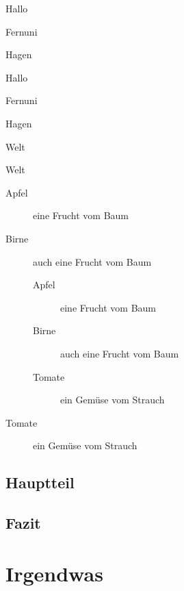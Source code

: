 \documentclass[12pt,ngerman,parskip=half]{scrreprt}
\begin{document}
\begin{compactenum}[I]
\item Hallo
\item Fernuni
\item Hagen
\begin{compactenum}[A.]
\item Hallo
\item Fernuni
\item Hagen
\item Welt
\end{compactenum}
\item Welt
\end{compactenum}


\begin{description}
\item[Apfel] eine Frucht vom Baum
\item[Birne] auch eine Frucht vom Baum

\begin{description}
\item[Apfel] eine Frucht vom Baum
\item[Birne] auch eine Frucht vom Baum
\item[Tomate] ein Gemüse vom Strauch
\end{description}

\item[Tomate] ein Gemüse vom Strauch
\end{description}


\section{Hauptteil}

\blindtext[1] 

\blindtext[1]

\section{Fazit}

\blindtext[1] 

\chapter{Irgendwas}
\end{document}
